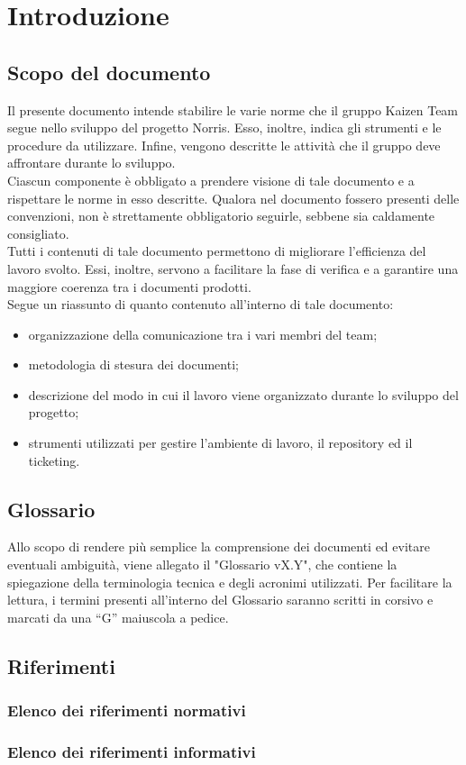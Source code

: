 \section{Introduzione}
	\subsection{Scopo del documento}
		Il presente documento intende stabilire le varie norme che il gruppo Kaizen Team segue nello sviluppo del progetto Norris. Esso, inoltre, indica gli strumenti e le procedure da utilizzare. Infine, vengono descritte le attività che il gruppo deve affrontare durante lo sviluppo.\\
		Ciascun componente è obbligato a prendere visione di tale documento e a rispettare le norme in esso descritte. Qualora nel documento fossero presenti delle convenzioni, non è strettamente obbligatorio seguirle, sebbene sia caldamente consigliato.\\
		Tutti i contenuti di tale documento permettono di migliorare l’efficienza del lavoro svolto. Essi, inoltre, servono a facilitare la fase di verifica e a garantire una maggiore coerenza tra i documenti prodotti.\\
		Segue un riassunto di quanto contenuto all'interno di tale documento:
		\begin{itemize}
			\item organizzazione della comunicazione tra i vari membri del team;
			\item metodologia di stesura dei documenti;
			\item descrizione del modo in cui il lavoro viene organizzato durante lo sviluppo del progetto;
			\item strumenti utilizzati per gestire l'ambiente di lavoro, il repository ed il ticketing.
		\end{itemize}
	\subsection{Glossario}
		Allo scopo di rendere più semplice la comprensione dei documenti ed evitare eventuali ambiguità, viene allegato il "Glossario vX.Y", che contiene la spiegazione della terminologia tecnica e degli acronimi utilizzati. Per facilitare la lettura, i termini presenti all'interno del Glossario saranno scritti in corsivo e marcati da una “G” maiuscola a pedice.
	\subsection{Riferimenti}
		\subsubsection{Elenco dei riferimenti normativi}
		\subsubsection{Elenco dei riferimenti informativi}
